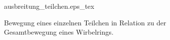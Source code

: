\begin{figure}
\centering
\def\svgwidth{0.4\columnwidth}
{ausbreitung_teilchen.eps_tex}
\caption{Bewegung eines einzelnen Teilchen in Relation zu der Gesamtbewegung eines Wirbelrings. \label{buch:papers:Wirbelringe:fig:ausbreitung_teilchen}}
\end{figure}